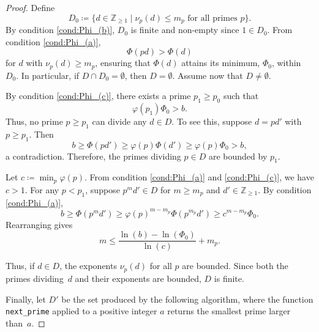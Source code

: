 \documentclass[a4paper]{amsart}
\theoremstyle{definition}
\theoremstyle{plain}
\newcommand{\IZ}{\mathbb{Z}}
\begin{document}
\begin{proof}
    Define
    \[
        D_0 \coloneqq \{d \in \IZ_{\geq 1} \mid \text{\(\nu_p(d) \leq m_p\) for all primes \(p\)}\}.
    \]
    By condition \ref{cond:Phi_(b)}, \(D_0\) is finite and non-empty since \(1 \in D_0\).
    From condition \ref{cond:Phi_(a)}, 
    \begin{equation*}
        \Phi(pd) > \Phi(d)
    \end{equation*}
    for \(d\) with \(\nu_p(d) \geq m_p\), ensuring that \(\Phi(d)\) attains its minimum, \(\Phi_0\), within \(D_0\). In particular, if \(D \cap D_0 = \emptyset\), then \(D = \emptyset\). Assume now that \(D \neq \emptyset\).

    By condition \ref{cond:Phi_(c)}, there exists a prime \(p_1 \geq p_0\) such that
    \[
        \varphi(p_1) \Phi_0 > b.
    \]
    Thus, no prime \(p \geq p_1\) can divide any \(d \in D\). To see this, suppose \(d = pd'\) with \(p \geq p_1\). Then
    \[
        b \geq \Phi(pd') \geq \varphi(p) \Phi(d') \geq \varphi(p) \Phi_0 > b,
    \]
    a contradiction. Therefore, the primes dividing \(p \in D\) are bounded by \(p_1\).

    Let \(c \coloneqq \min_{p} \varphi(p)\).
    From condition \ref{cond:Phi_(a)} and \ref{cond:Phi_(c)}, we have \(c > 1\). For any \(p < p_1\), suppose \(p^m d' \in D\) for \(m \geq m_p\) and \(d' \in \IZ_{\geq 1}\).  By condition \ref{cond:Phi_(a)}, 
    \[
        b \geq \Phi(p^m d') \geq \varphi(p)^{m-m_p}\Phi(p^{m_p}d') \geq c^{m - m_p} \Phi_0. 
    \]  
    Rearranging gives  
    \[
        m \leq \frac{\ln(b) - \ln(\Phi_0)}{\ln(c)} + m_p.
    \]  

    Thus, if $d \in D$, the exponents \(\nu_p(d)\) for all \(p\) are bounded. Since both the primes dividing~\(d\) and their exponents are bounded, \(D\) is finite.

    Finally, let \(D'\) be the set produced by the following algorithm, where the function \verb|next_prime| applied to a positive integer \(a\) returns the smallest prime larger than~\(a\).


\end{proof}
\end{document}

